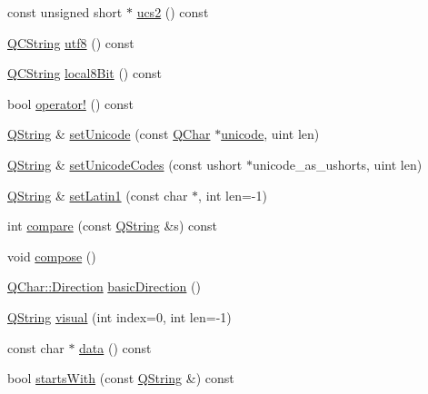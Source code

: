 \begin{DoxyCompactItemize}
\item 
const unsigned short $\ast$ \hyperlink{class_q_string_aa335352c86d6e44651e98cf3c52356a5}{ucs2} () const 
\item 
\hyperlink{class_q_c_string}{Q\-C\-String} \hyperlink{class_q_string_a6ec04d8d741b6c84495e1dfd385f4be0}{utf8} () const 
\item 
\hyperlink{class_q_c_string}{Q\-C\-String} \hyperlink{class_q_string_a3dec5ae625f368220311bc101e6b7099}{local8\-Bit} () const 
\item 
bool \hyperlink{class_q_string_ac8b1d32dbd52d431450c70b151cfa205}{operator!} () const 
\item 
\hyperlink{class_q_string}{Q\-String} \& \hyperlink{class_q_string_a8ae405bf0631b85329d4f2d83e5b0937}{set\-Unicode} (const \hyperlink{class_q_char}{Q\-Char} $\ast$\hyperlink{class_q_string_a65a250696de2e5cb83a8e01a9603cea0}{unicode}, uint len)
\item 
\hyperlink{class_q_string}{Q\-String} \& \hyperlink{class_q_string_adb45d1286298c0188aa34af6994ce9e1}{set\-Unicode\-Codes} (const ushort $\ast$unicode\-\_\-as\-\_\-ushorts, uint len)
\item 
\hyperlink{class_q_string}{Q\-String} \& \hyperlink{class_q_string_a20f95a9c7421a936e941cbacf44a37b1}{set\-Latin1} (const char $\ast$, int len=-\/1)
\item 
int \hyperlink{class_q_string_a3e058cacf3fd70cb01fb652dbc7a1118}{compare} (const \hyperlink{class_q_string}{Q\-String} \&s) const 
\item 
void \hyperlink{class_q_string_a1718501579e00039de2b0a0d7a489895}{compose} ()
\item 
\hyperlink{class_q_char_a224b9163917ac32fc95a60d8c1eec3aa}{Q\-Char\-::\-Direction} \hyperlink{class_q_string_a371ea7ad71eff5a7f21b9a054ef6d017}{basic\-Direction} ()
\item 
\hyperlink{class_q_string}{Q\-String} \hyperlink{class_q_string_a3a5f3234c43870084c5115ca1f18c2eb}{visual} (int index=0, int len=-\/1)
\item 
const char $\ast$ \hyperlink{class_q_string_a3030b6aaaab96d31eb5b62c44a54aeaf}{data} () const 
\item 
bool \hyperlink{class_q_string_a2211b3583a350f8535312fafadfde05b}{starts\-With} (const \hyperlink{class_q_string}{Q\-String} \&) const 
\end{DoxyCompactItemize}
